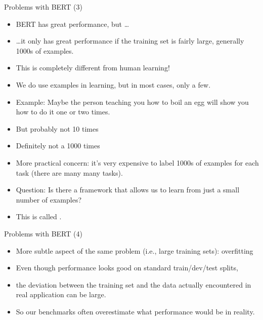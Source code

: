 
\begin{vbframe}{Problems with BERT (3)}

\vfill

  \begin{itemize}
\item BERT has great performance, but \ldots
\item \ldots it only has great performance if the
training set is fairly large, generally 1000s of examples.
\item This is completely different from human learning!
\item We do use examples in learning, but in most
cases, only a few.
\item Example: Maybe the person teaching you how to
boil an egg will show you how to do it one or two times.
\item
But
probably not 10 times
\item
Definitely not a 1000 times 
\item More practical concern: it's very expensive to
label 1000s of examples for each task (there are many  many tasks).
\item Question: Is there a framework that allows us to
learn from just a small number of examples?
\item This is called .
    \end{itemize}

\vfill

\end{vbframe}


\begin{vbframe}{Problems with BERT (4)}

\vfill

  \begin{itemize}
\item More subtle aspect of the same problem (i.e.,
large training sets): overfitting
\item Even though performance looks good on standard
train/dev/test splits, 
\item the deviation between the training set and the
data actually encountered in real application can be large.
\item So our benchmarks often overestimate what
performance would be in reality.
    \end{itemize}

\vfill

\end{vbframe}


\endlecture

